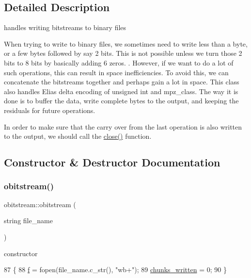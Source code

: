 \subsection{Detailed Description}
handles writing bitstreams to binary files 

When trying to write to binary files, we sometimes need to write less than a byte, or a few bytes followed by say 2 bits. This is not possible unless we turn those 2 bits to 8 bits by basically adding 6 zeros. . However, if we want to do a lot of such operations, this can result in space inefficiencies. To avoid this, we can concatenate the bitstreams together and perhaps gain a lot in space. This class also handles Elias delta encoding of unsigned int and mpz\+\_\+class. The way it is done is to buffer the data, write complete bytes to the output, and keeping the residuals for future operations.

In order to make sure that the carry over from the last operation is also written to the output, we should call the \hyperlink{classobitstream_a6d76dbba302e1181fbc9609072a4c2a0}{close()} function. 

\subsection{Constructor \& Destructor Documentation}
\mbox{\label{classobitstream_a99e4f20344a99c1e8d892eb0c28b3daa}} 
\subsubsection{\texorpdfstring{obitstream()}{obitstream()}}
{\footnotesize\ttfamily obitstream\+::obitstream (\begin{DoxyParamCaption}\item[{string}]{file\+\_\+name }\end{DoxyParamCaption})\hspace{0.3cm}{\ttfamily [inline]}}



constructor 


\begin{DoxyCode}
87                               \{
88     \hyperlink{classobitstream_ac589d74745217748c888ae777ab324a7}{f} = fopen(file\_name.c\_str(), \textcolor{stringliteral}{"wb+"});
89     \hyperlink{classobitstream_a3022397f2b6133ea5990016d9d078a2f}{chunks\_written} = 0;
90   \}
\end{DoxyCode}


